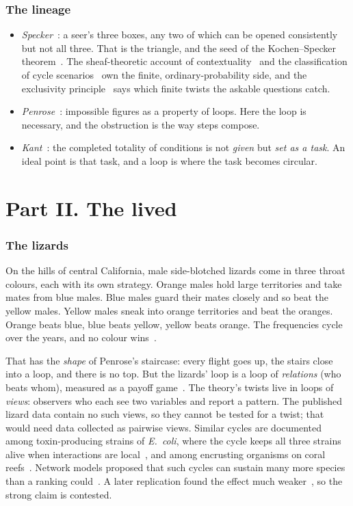 \documentclass[11pt]{article}
\begin{document}
\section{The lineage}
\begin{itemize}[nosep]
  \item \emph{Specker}~\cite{specker1960}: a seer's three boxes, any two of
    which can be opened consistently but not all three. That is the triangle,
    and the seed of the Kochen--Specker theorem~\cite{kochenspecker1967}. The
    sheaf-theoretic account of contextuality~\cite{abramskybrandenburger2011}
    and the classification of cycle scenarios~\cite{kharoofipekokay2024} own the
    finite, ordinary-probability side, and the exclusivity
    principle~\cite{cabello2013,fritz2013} says which finite twists the askable
    questions catch.
  \item \emph{Penrose}~\cite{penrose1991}: impossible figures as a property of
    loops. Here the loop is necessary, and the obstruction is the way steps
    compose.
  \item \emph{Kant}~\cite{kant}: the completed totality of conditions is not
    \emph{given} but \emph{set as a task}. An ideal point is that task, and a
    loop is where the task becomes circular.
\end{itemize}

\part*{Part II. The lived}

\section{The lizards}
On the hills of central California, male side-blotched lizards come in three
throat colours, each with its own strategy. Orange males hold large territories
and take mates from blue males. Blue males guard their mates closely and so beat
the yellow males. Yellow males sneak into orange territories and beat the
oranges. Orange beats blue, blue beats yellow, yellow beats orange. The
frequencies cycle over the years, and no colour wins~\cite{sinervolively1996}.

That has the \emph{shape} of Penrose's staircase: every flight goes up, the
stairs close into a loop, and there is no top. But the lizards' loop is a loop
of \emph{relations} (who beats whom), measured as a payoff
game~\cite{sinervolively1996}. The theory's twists live in loops of
\emph{views}: observers who each see two variables and report a pattern. The
published lizard data contain no such views, so they cannot be tested for a
twist; that would need data collected as pairwise views. Similar cycles are documented among
toxin-producing strains of \emph{E.\ coli}, where the cycle keeps all three
strains alive when interactions are local~\cite{kerr2002}, and among encrusting
organisms on coral reefs~\cite{bussjackson1979}. Network models proposed that
such cycles can sustain many more species than a ranking
could~\cite{allesinalevine2011}. A later replication found the effect much
weaker~\cite{larsenhaine2015}, so the strong claim is contested.
\end{document}
